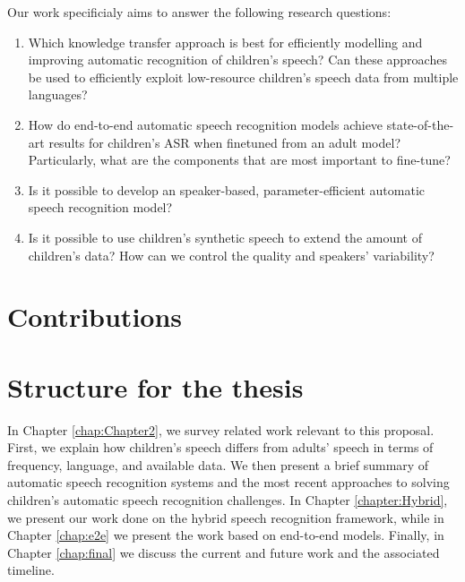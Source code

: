 Our work specificialy aims to answer the following research questions:
\begin{enumerate}
\item Which knowledge transfer approach is best for efficiently modelling and improving automatic recognition of children's speech? Can these approaches be used to efficiently exploit low-resource children's speech data from multiple languages?
\item  How do end-to-end automatic speech recognition models achieve state-of-the-art results for children's ASR when finetuned from an adult model? Particularly, what are the components that are most important to fine-tune?
\item Is it possible to develop an speaker-based, parameter-efficient automatic speech recognition model?
\item Is it possible to use children's synthetic speech to extend the amount of children's data? How can we control the quality and speakers’ variability?
\end{enumerate}

\section{Contributions}
% 



\section{Structure for the thesis}

In Chapter \ref{chap:Chapter2}, we survey related work relevant to this proposal. First, we explain how children's speech differs from adults' speech in terms of frequency, language, and available data. We then present a brief summary of automatic speech recognition systems and the most recent approaches to solving children's automatic speech recognition challenges. In Chapter \ref{chapter:Hybrid}, we present our work done on the hybrid speech recognition framework, while in Chapter \ref{chap:e2e} we present the work based on end-to-end models. Finally, in Chapter \ref{chap:final} we discuss the current and future work and the associated timeline.
